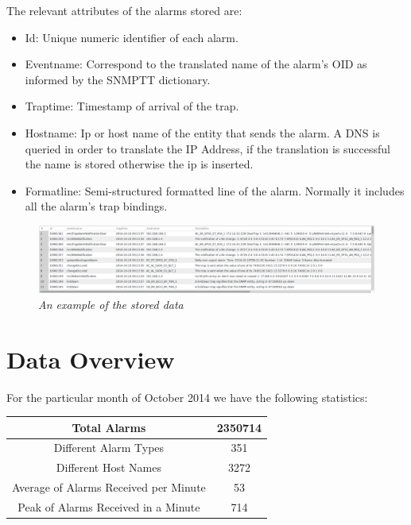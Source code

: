 \documentclass[10pt,a4paper]{report}
\begin{document}
The relevant attributes of the alarms stored are:

\begin{itemize}
  \item Id: Unique numeric identifier of each alarm.
  \item Eventname: Correspond to the translated name of the alarm's OID as informed by the SNMPTT dictionary.
  \item Traptime: Timestamp of arrival of the trap.
  \item Hostname: Ip or host name of the entity that sends the alarm. A DNS is queried in order to translate the IP Address, if the translation is successful the name is stored otherwise the ip is inserted. 
  \item Formatline: Semi-structured formatted line of the alarm. Normally it includes all the alarm's trap bindings.
\end{itemize}

\begin{figure}[H]
 \includegraphics[scale=0.4]{alarms_db_sample.png}
  \centering
  \caption{\textit{An example of the stored data}}
  \label{fig:acc_dataexample}
\end{figure}	

\section{Data Overview} 
For the particular month of October 2014 we have the following statistics:

\begin{center}
 \begin{tabular}{||c | c ||} 
 \hline\hline
 Total Alarms  & 2350714 \\ 
 \hline
 Different Alarm Types & 351 \\ 
 \hline
 Different Host Names & 3272 \\
  \hline
 Average of Alarms Received per Minute & 53 \\
 \hline
 Peak of Alarms Received in a Minute & 714 \\
 \hline\hline
\end{tabular}
\end{center}
\end{document}
